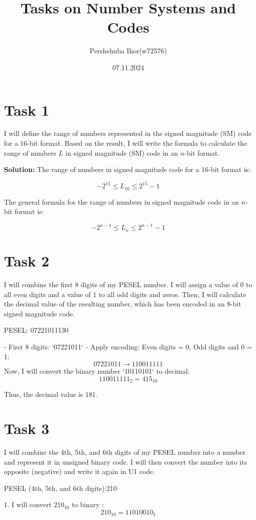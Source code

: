 \documentclass{article}
\title{Tasks on Number Systems and Codes}
\author{Pershehuba Ihor(w72576)}
\date{07.11.2024}
\begin{document}
\maketitle

\section*{Task 1}
I will define the range of numbers represented in the signed magnitude (SM) code for a 16-bit format. Based on the result, I will write the formula to calculate the range of numbers \( L \) in signed magnitude (SM) code in an \( n \)-bit format.

\textbf{Solution:}  
The range of numbers in signed magnitude code for a 16-bit format is:

\[
-2^{15} \leq L_{16} \leq 2^{15} - 1
\]

The general formula for the range of numbers in signed magnitude code in an \( n \)-bit format is:

\[
-2^{n-1} \leq L_n \leq 2^{n-1} - 1
\]

\section*{Task 2}
I will combine the first 8 digits of my PESEL number. I will assign a value of 0 to all even digits and a value of 1 to all odd digits and zeros. Then, I will calculate the decimal value of the resulting number, which has been encoded in an 8-bit signed magnitude code.

PESEL: 07221011130

- First 8 digits: `07221011`
- Apply encoding: Even digits = 0, Odd digits and 0 = 1:
\[
07221011 \rightarrow 110011111
\]
Now, I will convert the binary number `10110101` to decimal:
\[
110011111_2 = 415_{10}
\]

Thus, the decimal value is \( 181 \).

\section*{Task 3}
I will combine the 4th, 5th, and 6th digits of my PESEL number into a number and represent it in unsigned binary code. I will then convert the number into its opposite (negative) and write it again in U1 code.

PESEL (4th, 5th, and 6th digits):210

1. I will convert \( 210_{10} \) to binary :
   \[
   210_{10} = 11010010_2
   \]
\end{document}
